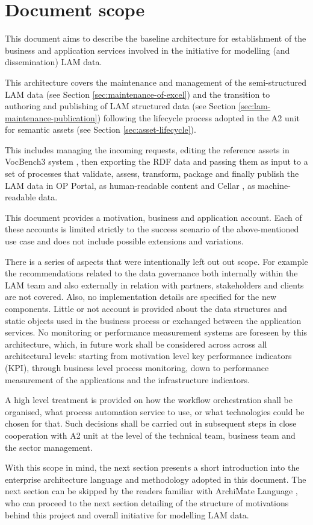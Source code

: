 	\section{Document scope}
	\label{sec:scope}
	
	This document aims to describe the baseline architecture for establishment of the business and application services involved in the initiative for modelling (and dissemination) LAM data. 
	 
	This architecture covers the maintenance and management of the semi-structured LAM data (see Section \ref{sec:maintenance-of-excel}) and the transition to authoring and publishing of LAM structured data (see Section \ref{sec:lam-maintenance-publication}) following the lifecycle process adopted in the A2 unit for semantic assets (see Section \ref{sec:asset-lifecycle}). 
	
	This includes managing the incoming requests, editing the reference assets in VocBench3 system \citep{stellato2017towards,stellatovocbench}, then exporting the RDF data and passing them as input to a set of processes that validate, assess, transform, package and finally publish the LAM data in OP Portal, as human-readable content and Cellar \cite{cdm-francesconi2015ontology}, as machine-readable data. 
		
	This document provides a motivation, business and application account. Each of these accounts is limited strictly to the success scenario of the above-mentioned use case and does not include possible extensions and variations.
	
	There is a series of aspects that were intentionally left out out scope. For example the recommendations related to the data governance both internally within the LAM team and also externally in relation with partners, stakeholders and clients are not covered. Also, no implementation details are specified for the new components. Little or not account is provided about the data structures and static objects used in the business process or exchanged between the application services. No monitoring or performance measurement systems are foreseen by this architecture, which, in future work shall be considered across across all architectural levels: starting from motivation level key performance indicators (KPI), through business level process monitoring, down to performance measurement of the applications and the infrastructure indicators. 
	
	A high level treatment is provided on how the workflow orchestration shall be organised, what process automation service to use, or what technologies could be chosen for that. Such decisions shall be carried out in subsequent steps in close cooperation with A2 unit at the level of the technical team, business team and the sector management. 
	
	With this scope in mind, the next section presents a short introduction into the enterprise architecture language and methodology adopted in this document. The next section can be skipped by the readers familiar with ArchiMate Language \citep{archimate3.1}, who can proceed to the next section detailing of the structure of motivations behind this project and overall initiative for modelling LAM data.